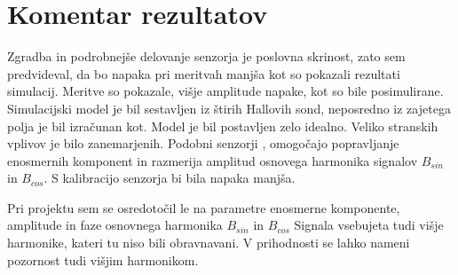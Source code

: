 \section{Komentar rezultatov}
Zgradba in podrobnejše delovanje senzorja je poslovna skrinost, zato sem predvideval, da bo napaka pri meritvah manjša kot so pokazali rezultati simulacij. Meritve so pokazale, višje amplitude napake, kot so bile posimulirane.  Simulacijski model je bil sestavljen iz štirih Hallovih sond, neposredno iz zajetega polja je bil izračunan kot. Model je bil postavljen zelo idealno. Veliko stranskih vplivov je bilo zanemarjenih. 
Podobni senzorji \cite{iCMHM}, omogočajo popravljanje enosmernih komponent in razmerija amplitud osnovega harmonika signalov  $B_{sin}$ in $B_{cos}$. S kalibracijo senzorja bi bila napaka manjša.

Pri projektu sem se osredotočil le na parametre enosmerne komponente, amplitude in faze osnovnega harmonika  $B_{sin}$ in $B_{cos}$ Signala vsebujeta tudi višje harmonike, kateri tu niso bili obravnavani. V prihodnosti se lahko nameni pozornost tudi višjim harmonikom.




